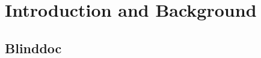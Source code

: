 \documentclass[\classfontsize,\papersize,twoside,showtrims,extrafontsizes]{memoir}  %
\begin{document}
\prefrontmatter

\cleartoevenpage

\cleartooddpage

\clearforchapter

\frontmatter





% 

\clearforchapter
\printglossary[title=Abbreviations, toctitle=Abbrevations, type=\acronymtype]
\clearforchapter
\tableofcontents
\clearforchapter
\mylistoftodos

\mainmatter
\part[Introduction and Background]{Introduction and Background}
% 
% 
\chapter{Blinddoc}
\blinddocument
% 
% 


\appendix


\backmatter
\printbibliography
\end{document}
